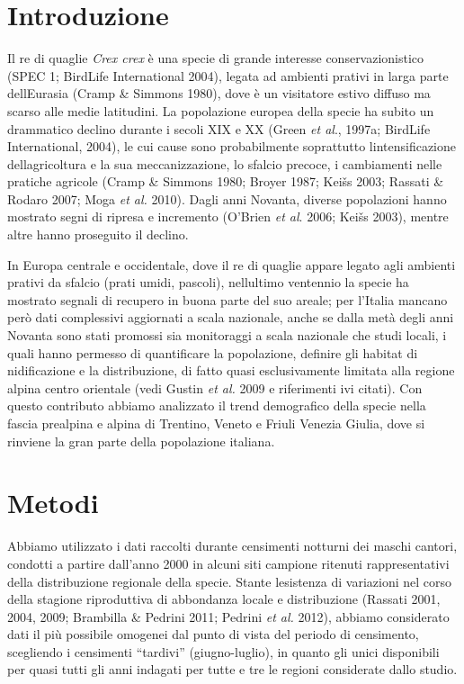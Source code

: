 \section*{Introduzione}

Il re di quaglie \textit{Crex crex} \`e una specie di grande interesse
conservazionistico (SPEC 1; BirdLife International 2004), legata ad
ambienti prativi in larga parte dell{\textquotesingle}Eurasia (Cramp \&
Simmons 1980), dove \`e un visitatore estivo diffuso ma scarso alle
medie latitudini. La popolazione europea della specie ha subito un
drammatico declino durante i secoli XIX e XX (Green \textit{et al}.,
1997a; BirdLife International, 2004), le cui cause sono probabilmente
soprattutto l{\textquotesingle}intensificazione
dell{\textquotesingle}agricoltura e la sua meccanizzazione, lo sfalcio
precoce, i cambiamenti nelle pratiche agricole (Cramp \& Simmons 1980;
Broyer 1987; Kei\v{s}s 2003; Rassati \& Rodaro 2007; Moga \textit{et
al.} 2010). Dagli anni Novanta, diverse popolazioni hanno mostrato
segni di ripresa e incremento (O{\textquoteright}Brien \emph{et al}.
2006; Kei\v{s}s 2003), mentre altre hanno proseguito il declino.

In Europa centrale e occidentale, dove il re di quaglie appare legato
agli ambienti prativi da sfalcio (prati umidi, pascoli),
nell{\textquotesingle}ultimo ventennio la specie ha mostrato segnali di
recupero in buona parte del suo areale; per l{\textquoteright}Italia
mancano per\`o dati complessivi aggiornati a scala nazionale, anche se
dalla met\`a degli anni Novanta sono stati promossi sia monitoraggi a
scala nazionale che studi locali, i quali hanno permesso di
quantificare la popolazione, definire gli habitat di nidificazione e la
distribuzione, di fatto quasi esclusivamente limitata alla regione
alpina centro orientale (vedi Gustin \textit{et al.} 2009 e riferimenti
ivi citati). Con questo contributo abbiamo analizzato il trend
demografico della specie nella fascia prealpina e alpina di Trentino,
Veneto e Friuli Venezia Giulia, dove si rinviene la gran parte della
popolazione italiana. 

\section*{Metodi}

Abbiamo utilizzato i dati raccolti durante censimenti notturni dei
maschi cantori, condotti a partire dall{\textquoteright}anno 2000 in
alcuni siti campione ritenuti rappresentativi della distribuzione
regionale della specie. Stante l{\textquotesingle}esistenza di
variazioni nel corso della stagione riproduttiva di abbondanza locale e
distribuzione (Rassati 2001, 2004, 2009; Brambilla \& Pedrini 2011;
Pedrini \textit{et al.} 2012), abbiamo considerato dati il pi\`u
possibile omogenei dal punto di vista del periodo di censimento,
scegliendo i censimenti {\textquotedblleft}tardivi{\textquotedblright}
(giugno-luglio), in quanto gli unici disponibili per quasi tutti gli
anni indagati per tutte e tre le regioni considerate dallo studio. 

